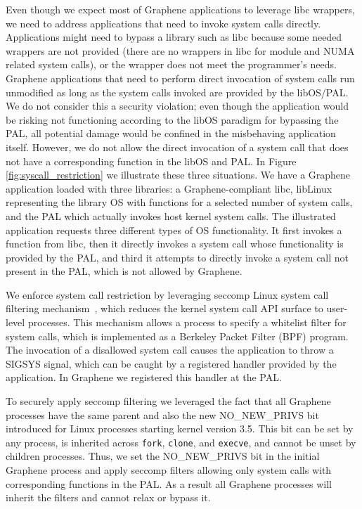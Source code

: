 Even though we expect most of Graphene applications to leverage libc
wrappers, we need to address applications that need to invoke system
calls directly. Applications might need to bypass a library such as
libc because some needed wrappers are not provided (there are no
wrappers in libc for module and NUMA related system calls), or the
wrapper does not meet the programmer’s needs. Graphene applications
that need to perform direct invocation of system calls run unmodified
as long as the system calls invoked are provided by the libOS/PAL. We
do not consider this a security violation; even though the application
would be risking not functioning according to the libOS paradigm for
bypassing the PAL, all potential damage would be confined in the
misbehaving application itself.  However, we do not allow the direct
invocation of a system call that does not have a corresponding
function in the libOS and PAL. In Figure \ref{fig:syscall_restriction}
we illustrate these three situations. We have a Graphene application
loaded with three libraries: a Graphene-compliant libc, libLinux
representing the library OS with functions for a selected number of
system calls, and the PAL which actually invokes host kernel system
calls. The illustrated application requests three different types of
OS functionality. It first invokes a function from libc, then it
directly invokes a system call whose functionality is provided by the
PAL, and third it attempts to directly invoke a system call not
present in the PAL, which is not allowed by Graphene.

We enforce system call restriction by leveraging seccomp Linux system
call filtering mechanism~\citep{seccomp}, which reduces the kernel
system call API surface to user-level processes. This mechanism allows
a process to specify a whitelist filter for system calls, which is
implemented as a Berkeley Packet Filter (BPF) program. The invocation
of a disallowed system call causes the application to throw a SIGSYS
signal, which can be caught by a registered handler provided by the
application. In Graphene we registered this handler at the PAL.

To securely apply seccomp filtering we leveraged the fact that all
Graphene processes have the same parent and also the new
NO\_NEW\_PRIVS bit introduced for Linux processes starting kernel
version 3.5. This bit can be set by any process, is inherited across
{\tt fork}, {\tt clone}, and {\tt execve}, and cannot be unset by
children processes. Thus, we set the NO\_NEW\_PRIVS bit in the initial
Graphene process and apply seccomp filters allowing only system calls
with corresponding functions in the PAL. As a result all Graphene
processes will inherit the filters and cannot relax or bypass it.



